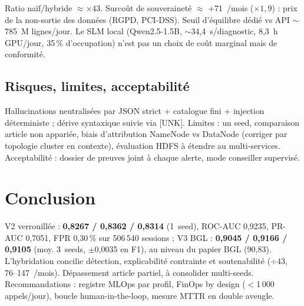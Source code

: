 \documentclass[12pt,a4paper]{report}
\begin{document}
Ratio naïf/hybride $\approx \times 43$. Surcoût de souveraineté $\approx$ +71~\texteuro/mois ($\times 1{,}9$) : prix de la non-sortie des données (RGPD, PCI-DSS). Seuil d'équilibre dédié vs API $\sim$785~M lignes/jour. Le SLM local (Qwen2.5-1.5B, $\sim$34,4~s/diagnostic, 8,3~h GPU/jour, 35\,\% d'occupation) n'est pas un choix de coût marginal mais de conformité.

\subsection{Risques, limites, acceptabilité}

Hallucinations neutralisées par JSON strict + catalogue fini + injection déterministe ; dérive syntaxique suivie via [UNK]. Limites : un seed, comparaison article non appariée, biais d'attribution NameNode vs DataNode (corriger par topologie cluster en contexte), évaluation HDFS à étendre au multi-services. Acceptabilité : dossier de preuves joint à chaque alerte, mode conseiller supervisé.

\section{Conclusion}

V2 verrouillée : \textbf{0,8267 / 0,8362 / 0,8314} (1~seed), ROC-AUC 0,9235, PR-AUC 0,7051, FPR 0,30\,\% sur 506\,540 sessions ; V3 BGL : \textbf{0,9045 / 0,9166 / 0,9105} (moy. 3~seeds, $\pm$0,0035 en F1), au niveau du papier BGL (90,83). L'hybridation concilie détection, explicabilité contrainte et soutenabilité ($\div 43$, 76--147~\texteuro/mois). Dépassement article partiel, à consolider multi-seeds. Recommandations : registre MLOps par profil, FinOps by design ($<$1\,000 appels/jour), boucle human-in-the-loop, mesure MTTR en double aveugle.
\end{document}
